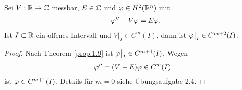 \begin{cor}
\label{prop:1.10}
Sei $V:\mathbb{R}\to\mathbb{C}$ messbar, $E\in \mathbb{C}$ und $\varphi\in H^2(\mathbb{R}^n)$ mit
\begin{align*}
-\varphi'' + V\varphi= E\varphi. 
\end{align*}
Ist $I\subset\mathbb{R}$ ein offenes Intervall und $V\big|_I\in C^m(I)$, dann ist
$\varphi\big|_I \in C^{m+2}(I)$.\fishhere
\end{cor}
\begin{proof}
Nach Theorem \ref{prop:1.9} ist $\varphi\big|_I\in C^{m+1}(I)$. Wegen
\begin{align*}
\varphi'' = (V-E)\varphi \in C^m(I)
\end{align*}
ist $\varphi\in C^{m+1}(I)$. Details für $m=0$ siehe Übungsaufgabe 2.4.\qedhere
\end{proof}

